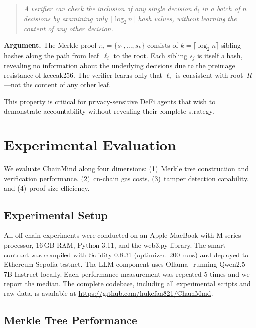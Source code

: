 \documentclass[manuscript,nonacm]{acmart}
\begin{document}
\begin{quote}
\emph{A verifier can check the inclusion of any single decision $d_i$ in a batch of $n$ decisions by examining only $\lceil \log_2 n \rceil$ hash values, without learning the content of any other decision.}
\end{quote}

\textbf{Argument.}
The Merkle proof $\pi_i = \{s_1, \ldots, s_k\}$ consists of $k = \lceil \log_2 n \rceil$ sibling hashes along the path from leaf~$\ell_i$ to the root.
Each sibling $s_j$ is itself a hash, revealing no information about the underlying decisions due to the preimage resistance of keccak256.
The verifier learns only that $\ell_i$ is consistent with root~$R$---not the content of any other leaf.

This property is critical for privacy-sensitive DeFi agents that wish to demonstrate accountability without revealing their complete strategy.


\section{Experimental Evaluation}
\label{sec:evaluation}

We evaluate ChainMind along four dimensions: (1)~Merkle tree construction and verification performance, (2)~on-chain gas costs, (3)~tamper detection capability, and (4)~proof size efficiency.

\subsection{Experimental Setup}

All off-chain experiments were conducted on an Apple MacBook with M-series processor, 16\,GB RAM, Python 3.11, and the web3.py library.
The smart contract was compiled with Solidity 0.8.31 (optimizer: 200 runs) and deployed to Ethereum Sepolia testnet.
The LLM component uses Ollama~\cite{ollama} running Qwen2.5-7B-Instruct locally.
Each performance measurement was repeated 5 times and we report the median.
The complete codebase, including all experimental scripts and raw data, is available at \url{https://github.com/liukefan821/ChainMind}.

\subsection{Merkle Tree Performance}
\end{document}
